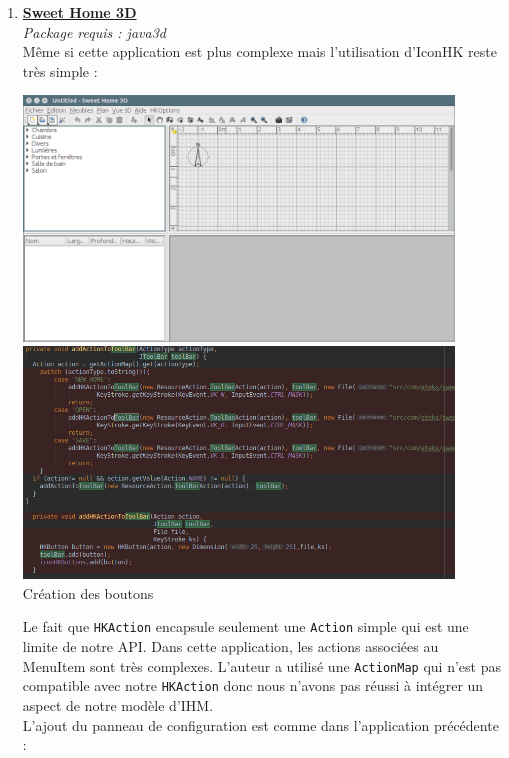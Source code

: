 \documentclass[12pt,a4paper]{article}
\begin{document}
\begin{enumerate}
\begin{center}
\end{center}
\item {\large \textbf{\href{https://github.com/Vanuan/sweethome3d}{Sweet Home 3D}}}\\
\textit{Package requis : java3d}\\
Même si cette application est plus complexe mais l'utilisation d'IconHK reste très simple :
\begin{center}
	\includegraphics[width=0.9\textwidth]{08.png}\\
	\includegraphics[width=0.9\textwidth]{10.png}\\
	Création des boutons\\
\end{center}
Le fait que \texttt{HKAction} encapsule seulement une \texttt{Action} simple qui est une limite de notre API.
Dans cette application, les actions associées au MenuItem sont très complexes. L'auteur a utilisé une \texttt{ActionMap} qui n'est pas compatible avec notre \texttt{HKAction} donc nous n'avons pas réussi à intégrer un aspect de notre modèle d'IHM.\\
L'ajout du panneau de configuration est comme dans l'application précédente :
\begin{center}

\end{center}
\end{enumerate}
\end{document}
